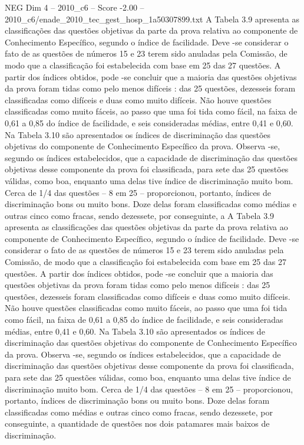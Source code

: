 \begin{textsample}{NEG Dim 4 – 2010\_c6 – Score -2.00 – 2010\_c6/enade\_2010\_tec\_gest\_hosp\_1a50307899.txt}
A Tabela 3.9 apresenta as classificações das questões objetivas da parte da prova relativa ao componente de Conhecimento Específico, segundo o índice de facilidade.
Deve -se considerar o fato de as questões de números 15 e 23 terem sido anuladas pela Comissão, de modo que a classificação foi estabelecida com base em 25 das 27 questões.
A partir dos índices obtidos, pode -se concluir que a maioria das questões objetivas da prova foram tidas como pelo menos difíceis : das 25 questões, dezesseis foram classificadas como difíceis e duas como muito difíceis.
Não houve questões classificadas como muito fáceis, ao passo que uma foi tida como fácil, na faixa de 0,61 a 0,85 do índice de facilidade, e seis consideradas médias, entre 0,41 e 0,60.
Na Tabela 3.10 são apresentados os índices de discriminação das questões objetivas do componente de Conhecimento Específico da prova.
Observa -se, segundo os índices estabelecidos, que a capacidade de discriminação das questões objetivas desse componente da prova foi classificada, para sete das 25 questões válidas, como boa, enquanto uma delas tive índice de discriminação muito bom.
Cerca de 1/4 das questões – 8 em 25 – proporcionou, portanto, índices de discriminação bons ou muito bons.
Doze delas foram classificadas como médias e outras cinco como fracas, sendo dezessete, por conseguinte, a A Tabela 3.9 apresenta as classificações das questões objetivas da parte da prova relativa ao componente de Conhecimento Específico, segundo o índice de facilidade.
Deve -se considerar o fato de as questões de números 15 e 23 terem sido anuladas pela Comissão, de modo que a classificação foi estabelecida com base em 25 das 27 questões.
A partir dos índices obtidos, pode -se concluir que a maioria das questões objetivas da prova foram tidas como pelo menos difíceis : das 25 questões, dezesseis foram classificadas como difíceis e duas como muito difíceis.
Não houve questões classificadas como muito fáceis, ao passo que uma foi tida como fácil, na faixa de 0,61 a 0,85 do índice de facilidade, e seis consideradas médias, entre 0,41 e 0,60.
Na Tabela 3.10 são apresentados os índices de discriminação das questões objetivas do componente de Conhecimento Específico da prova.
Observa -se, segundo os índices estabelecidos, que a capacidade de discriminação das questões objetivas desse componente da prova foi classificada, para sete das 25 questões válidas, como boa, enquanto uma delas tive índice de discriminação muito bom.
Cerca de 1/4 das questões – 8 em 25 – proporcionou, portanto, índices de discriminação bons ou muito bons.
Doze delas foram classificadas como médias e outras cinco como fracas, sendo dezessete, por conseguinte, a quantidade de questões nos dois patamares mais baixos de discriminação.

\end{textsample}
